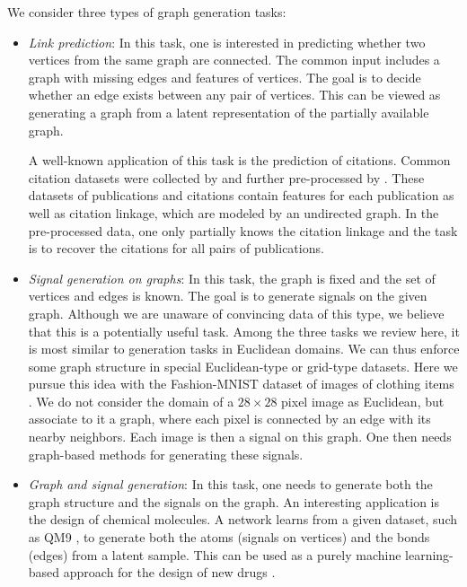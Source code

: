 \documentclass[conference]{IEEEtran}
\begin{document}
We consider three types of graph generation tasks:
\begin{itemize}[leftmargin=*]
    \item \emph{Link prediction}: In this task, one is interested in predicting whether two vertices from the same graph are connected. The common input includes a graph with missing edges and features of vertices. The goal is to decide whether an edge exists between any pair of vertices. This can be viewed as generating a graph from a latent representation of the partially available graph.  

    A well-known application of this task is the prediction of citations. Common citation datasets were collected by \cite{sen2008collective} and further pre-processed by \cite{kipf2016variational}. These datasets of publications and citations contain features for each publication as well as citation linkage, which are modeled by an undirected graph. In the pre-processed data, one only partially knows the citation linkage and the task is to recover the citations for all pairs of publications.
    
    \item \emph{Signal generation on graphs}: In this task, the graph is fixed and the set of vertices and edges is known. The goal is to generate signals on the given graph. Although we are unaware of convincing data of this type, we believe that this is a potentially useful task. Among the three tasks we review here, it is most similar to generation tasks in Euclidean domains. We can thus enforce some graph structure in special Euclidean-type or grid-type datasets.  Here we pursue this idea with the Fashion-MNIST dataset of images of clothing items \cite{xiao2017fashion}. We do not consider the domain of a $28 \times 28$ pixel image as Euclidean, but associate to it a graph, where each pixel is connected by an edge with its nearby neighbors. Each image is then a signal on this graph. One then needs graph-based methods for generating these signals. 
    
    \item \emph{Graph and signal generation}: In this task, one needs to generate both the graph structure and the signals on the graph. An interesting application is the design of chemical molecules. A network learns from a given dataset, such as QM9 \cite{ramakrishnan2014quantum}, to generate both the atoms (signals on vertices) and the bonds (edges) from a latent sample. This can be used as a purely machine learning-based approach for the design of new drugs \cite{olivecrona2017molecular}.
    
\end{itemize}
\end{document}
